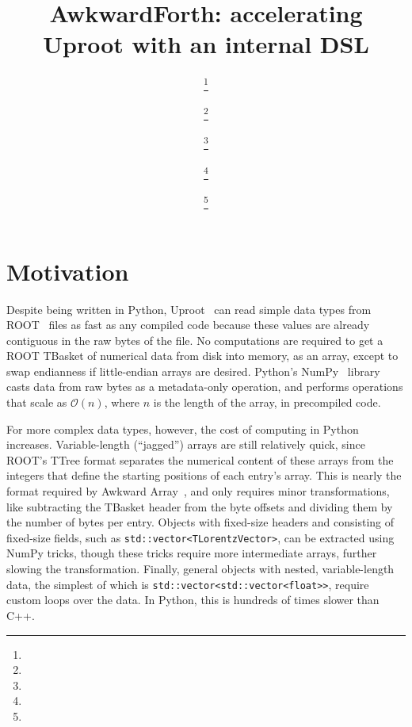 \documentclass{webofc}
\begin{document}
\title{AwkwardForth: accelerating Uproot with an internal DSL}

\author{ \fnsep\thanks{} \and
         \fnsep\thanks{} \and
         \fnsep\thanks{} \and
         \fnsep\thanks{} \and
         \fnsep\thanks{}}



\maketitle

\section{Motivation}

Despite being written in Python, Uproot~\cite{uproot} can read simple data types from ROOT~\cite{root} files as fast as any compiled code because these values are already contiguous in the raw bytes of the file. No computations are required to get a ROOT TBasket of numerical data from disk into memory, as an array, except to swap endianness if little-endian arrays are desired. Python's NumPy~\cite{numpy} library casts data from raw bytes as a metadata-only operation, and performs operations that scale as $\mathcal{O}(n)$, where $n$ is the length of the array, in precompiled code.

For more complex data types, however, the cost of computing in Python increases. Variable-length (``jagged'') arrays are still relatively quick, since ROOT's TTree format separates the numerical content of these arrays from the integers that define the starting positions of each entry's array. This is nearly the format required by Awkward Array~\cite{awkward}, and only requires minor transformations, like subtracting the TBasket header from the byte offsets and dividing them by the number of bytes per entry. Objects with fixed-size headers and consisting of fixed-size fields, such as \texttt{std::vector<TLorentzVector>}, can be extracted using NumPy tricks, though these tricks require more intermediate arrays, further slowing the transformation. Finally, general objects with nested, variable-length data, the simplest of which is \texttt{std::vector<std::vector<float>>}, require custom loops over the data. In Python, this is hundreds of times slower than C++.
\end{document}
